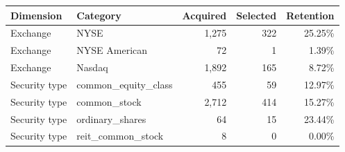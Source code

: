 \begin{tabular}{@{}llrrr@{}}
\toprule
Dimension & Category & Acquired & Selected & Retention \\
\midrule
Exchange & NYSE & 1,275 & 322 & 25.25\% \\
Exchange & NYSE American & 72 & 1 & 1.39\% \\
Exchange & Nasdaq & 1,892 & 165 & 8.72\% \\
Security type & common\_\allowbreak{}equity\_\allowbreak{}class & 455 & 59 & 12.97\% \\
Security type & common\_\allowbreak{}stock & 2,712 & 414 & 15.27\% \\
Security type & ordinary\_\allowbreak{}shares & 64 & 15 & 23.44\% \\
Security type & reit\_\allowbreak{}common\_\allowbreak{}stock & 8 & 0 & 0.00\% \\
\bottomrule
\end{tabular}
